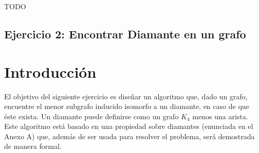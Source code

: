 \documentclass[a4paper,11pt] {article}
\begin{document}
% 
% 

TODO

\bigskip

\begin{center}
\section*{Ejercicio 2: Encontrar Diamante en un grafo}
\end{center}

\bigskip
\section*{Introducci\'on}

El objetivo del siguiente ejercicio es dise\~{n}ar un algoritmo que, dado un grafo, encuentre el menor subgrafo inducido isomorfo a un diamante, en caso de que \'este exista. Un diamante puede definirse como un grafo $K_{4}$ menos una arista. Este algoritmo est\'a basado en una propiedad sobre diamantes (enunciada en el Anexo A) que, adem\'as de ser usada para resolver el problema, ser\'a demostrada de manera formal.
\end{document}
